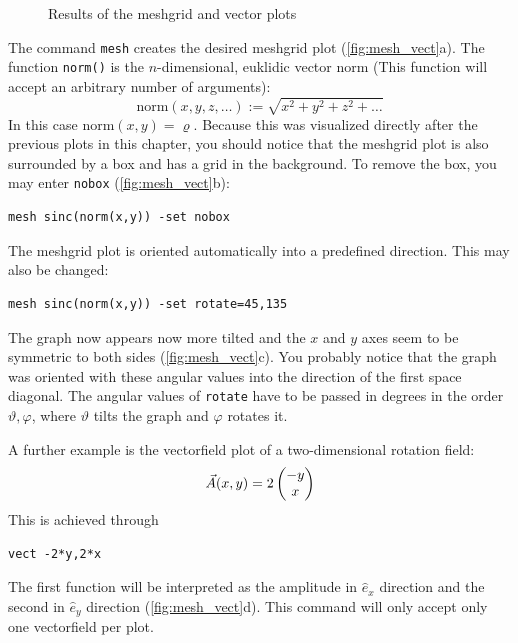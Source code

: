 \documentclass[DIV=14,headsepline,footsepline]{scrbook}
\begin{document}
\begin{figure}[p]
					\caption{Results of the meshgrid and vector plots}
					\label{fig:mesh_vect}
				\end{figure}
				The command \lstinline+mesh+ creates the desired meshgrid plot (\autoref{fig:mesh_vect}a). The function \lstinline+norm()+ is the $n$-dimensional, euklidic vector norm (This function will accept an arbitrary number of arguments):
				\begin{equation*}
					\text{norm}(x,y,z,\ldots) := \sqrt{x^2+y^2+z^2+\ldots}
				\end{equation*}
				In this case $\text{norm}(x,y) = \varrho$. Because this was visualized directly after the previous plots in this chapter, you should notice that the meshgrid plot is also surrounded by a box and has a grid in the background. To remove the box, you may enter \lstinline+nobox+ (\autoref{fig:mesh_vect}b):
				\begin{lstlisting}
mesh sinc(norm(x,y)) -set nobox
				\end{lstlisting}
				
				The meshgrid plot is oriented automatically into a predefined direction. This may also be changed:
				\begin{lstlisting}
mesh sinc(norm(x,y)) -set rotate=45,135
				\end{lstlisting}
				The graph now appears now more tilted and the $x$ and $y$ axes seem to be symmetric to both sides (\autoref{fig:mesh_vect}c). You probably notice that the graph was oriented with these angular values into the direction of the first space diagonal. The angular values of \lstinline+rotate+ have to be passed in degrees in the order $\vartheta,\varphi$, where $\vartheta$ tilts the graph and $\varphi$ rotates it.
				
				A further example is the vectorfield plot of a two-dimensional rotation field:
				\[\vec A(x,y) = 2\begin{pmatrix} -y\\x \end{pmatrix}\]
				This is achieved through
				\begin{lstlisting}
vect -2*y,2*x
				\end{lstlisting}
				The first function will be interpreted as the amplitude in $\hat e_x$ direction and the second in $\hat e_y$ direction (\autoref{fig:mesh_vect}d). This command will only accept only one vectorfield per plot.
				
\end{document}
